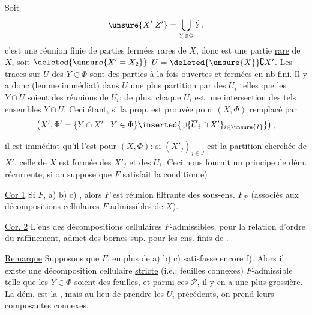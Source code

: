  Soit
\[
\unsure{X'|Z'}=\bigcup_{Y\in\Phi}\dot Y,
\]
c'est une réunion finie de parties fermées rares de $X$, donc est une partie \uline{rare} de $X$, soit $\deleted{\unsure{X'=X_2}}$ $U=\deleted{\unsure{X}}\complement X'$. Les traces  sur $U$ des $Y\in\Phi$ sont des  parties à la fois ouvertes et fermées  en \uline{nb fini}. Il y a donc (lemme  immédiat) dans $U$ une plus  partition  par des $U_i$  telles que les $Y\cap U$ soient des réunions  de $U_i$; de plus, chaque $U_i$ est une intersection  des tels ensembles $Y\cap U$,  Ceci étant, si la prop. est prouvée pour  $(X,\Phi)$ remplacé par
\[
\left(X',\Phi'=\{Y\cap X'\mid Y\in\Phi\}\inserted{\cup\{\overline U_i\cap X'\}_{i\in\unsure{I}}}\right),
\]


il est immédiat qu'il l'est pour $(X,\Phi)$: si $(X'_j)_{j\in J}$ est la partition cherchée de $X'$, celle de $X$ est formée des $X'_j$ et des $U_i$. Ceci nous fournit un principe de dém. récurrente, si on suppose que $F$ satisfait la condition e)


\uline{Cor 1} Si $F$,  a) b) c) , alors $F$ est réunion filtrante des sous-ens.  $F_{\mathcal P}$ (associés aux décompositions cellulaires  $F$-admissibles de $X$).

\uline{Cor. 2} L'ens  des décompositions cellulaires $F$-admissibles, pour la relation d'ordre du raffinement, admet des bornes sup. pour les  ens. finis de .

\uline{Remarque} Supposons que $F$, en plus de a) b) c)  satisfasse encore f). Alors il existe une décomposition cellulaire \uline{stricte}  (i.e.: feuilles connexes) $F$-admissible telle que les $Y\in\Phi$ soient des  feuilles, et \unsure{$=$|---} parmi ces $\mathcal P$, il y en a une plus grossière. La dém. est la , mais au lieu de prendre les $U_i$ précédents, on prend leurs composantes connexes.

